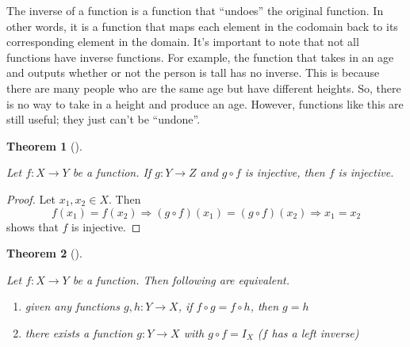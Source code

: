 \documentclass[
  letterpaper,
  10pt,
  reqno,
  twopage,
  openany]{book}
\providecommand{\tightlist}{%
  \setlength{\itemsep}{0pt}\setlength{\parskip}{0pt}}\usepackage{longtable,booktabs,array}
\theoremstyle{plain}
\theoremstyle{definition}
\theoremstyle{definition}
\theoremstyle{definition}
\theoremstyle{plain}
\theoremstyle{plain}
\newtheorem{theorem}{Theorem}[chapter]
\theoremstyle{remark}
\begin{document}
The inverse of a function is a function that ``undoes'' the original
function. In other words, it is a function that maps each element in the
codomain back to its corresponding element in the domain. It's important
to note that not all functions have inverse functions. For example, the
function that takes in an age and outputs whether or not the person is
tall has no inverse. This is because there are many people who are the
same age but have different heights. So, there is no way to take in a
height and produce an age. However, functions like this are still
useful; they just can't be ``undone''.

\leavevmode{}%
\begin{theorem}[]\label{thm-composition}

Let \(f:X\to Y\) be a function. If \(g:Y\to Z\) and \(g\circ f\) is
injective, then \(f\) is injective.

\end{theorem}

\begin{proof}

Let \(x_1, x_2\in X.\) Then \[
f(x_1)=f(x_2) \Longrightarrow (g\circ f)(x_1)=(g\circ f)(x_2) \Longrightarrow x_1=x_2
\] shows that \(f\) is injective.

\end{proof}

\leavevmode{}%
\begin{theorem}[]\label{thm-left-inverse}

Let \(f:X\to Y\) be a function. Then following are equivalent.

\begin{enumerate}
\def\labelenumi{\arabic{enumi}.}
\tightlist
\item
  given any functions \(g,h:Y\to X\), if \(f\circ g=f\circ h\), then
  \(g=h\)
\item
  there exists a function \(g:Y\to X\) with \(g\circ f=I_X\) (\(f\) has
  a left inverse)
\end{enumerate}

\end{theorem}
\end{document}
